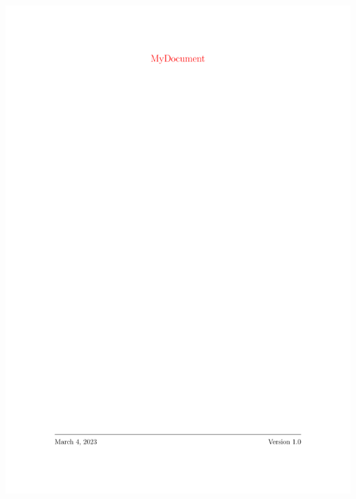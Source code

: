 \centering
\begin{myFIG}{}
	\includegraphics[page=1,scale=0.25]{examples/zz_bsp_file_CoverPage.pdf}
\end{myFIG}
\quad
